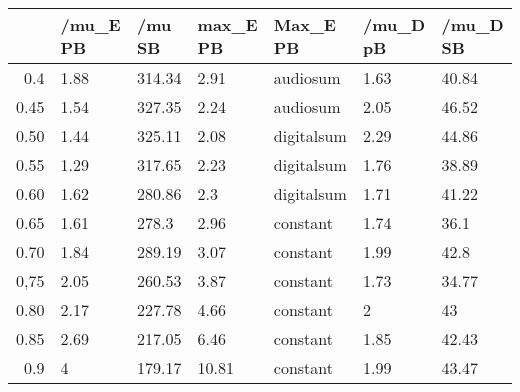 \begin{table}[ht]
\centering
\begin{tabular}{rllllll}
  \hline
 & /mu\_E PB & /mu SB & max\_E PB & Max\_E PB & /mu\_D pB & /mu\_D SB \\ 
  \hline
0.4 & 1.88 & 314.34 & 2.91 & audiosum & 1.63 & 40.84 \\ 
  0.45 & 1.54 & 327.35 & 2.24 & audiosum & 2.05 & 46.52 \\ 
  0.50 & 1.44 & 325.11 & 2.08 & digitalsum & 2.29 & 44.86 \\ 
  0.55 & 1.29 & 317.65 & 2.23 & digitalsum & 1.76 & 38.89 \\ 
  0.60 & 1.62 & 280.86 & 2.3 & digitalsum & 1.71 & 41.22 \\ 
  0.65 & 1.61 & 278.3 & 2.96 & constant & 1.74 & 36.1 \\ 
  0.70 & 1.84 & 289.19 & 3.07 & constant & 1.99 & 42.8 \\ 
  0,75 & 2.05 & 260.53 & 3.87 & constant & 1.73 & 34.77 \\ 
  0.80 & 2.17 & 227.78 & 4.66 & constant & 2 & 43 \\ 
  0.85 & 2.69 & 217.05 & 6.46 & constant & 1.85 & 42.43 \\ 
  0.9 & 4 & 179.17 & 10.81 & constant & 1.99 & 43.47 \\ 
   \hline
\end{tabular}
\end{table}
